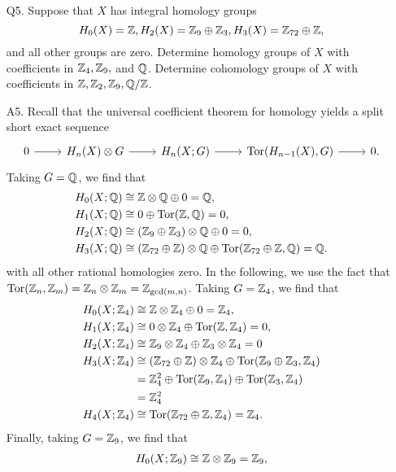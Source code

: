 \documentclass{../mathnotes}
\begin{document}
\begin{enumerate}
        \newpage
    \item[Q5.] Suppose that $X$ has integral homology groups
        \[H_0(X)=\mathbb{Z}, H_2(X)=\mathbb{Z}_9\oplus\mathbb{Z}_3, H_3(X)=\mathbb{Z}_{72}\oplus\mathbb{Z},\]
        and all other groups are zero. Determine homology groups of $X$ with
        coefficients in $\mathbb{Z}_4,\mathbb{Z}_9,$ and $\mathbb{Q}$. Determine cohomology groups
        of $X$ with coefficients in $\mathbb{Z},\mathbb{Z}_2,\mathbb{Z}_9,\mathbb{Q}/\mathbb{Z}$.
    \item[A5.] Recall that the universal coefficient theorem for homology
        yields a split short exact sequence
        \begin{equation*}
            \begin{tikzcd}
                0\ar{r}& H_n(X)\otimes G\ar{r}& H_n(X;G)\ar{r}& \Tor(H_{n-1}(X),G)\ar{r}& 0.
            \end{tikzcd}
        \end{equation*}
        Taking $G=\mathbb{Q}$, we find that 
        \begin{align*}
            H_0(X;\mathbb{Q})&\cong\mathbb{Z}\otimes\mathbb{Q}\oplus 0=\mathbb{Q},\\
            H_1(X;\mathbb{Q})&\cong0\oplus\operatorname{Tor}(\mathbb{Z},\mathbb{Q})=0,\\
            H_2(X;\mathbb{Q})&\cong (\mathbb{Z}_9\oplus\mathbb{Z}_3)\otimes\mathbb{Q}\oplus0=0,\\
            H_3(X;\mathbb{Q})&\cong (\mathbb{Z}_{72}\oplus\mathbb{Z})\otimes\mathbb{Q}\oplus\operatorname{Tor}(\mathbb{Z}_{72}\oplus\mathbb{Z},\mathbb{Q})=\mathbb{Q}.
        \end{align*}
        with all other rational homologies zero.
        In the following, we use the fact that $\operatorname{Tor}(\mathbb{Z}_n,\mathbb{Z}_m)=\mathbb{Z}_n\otimes\mathbb{Z}_m=\mathbb{Z}_{\text{gcd}(m,n)}$.
        Taking $G=\mathbb{Z}_4$, we find that
        \begin{align*}
            H_0(X;\mathbb{Z}_4) &\cong\mathbb{Z}\otimes\mathbb{Z}_4\oplus0=\mathbb{Z}_4,\\
            H_1(X;\mathbb{Z}_4) &\cong0\otimes\mathbb{Z}_4\oplus \operatorname{Tor}(\mathbb{Z},\mathbb{Z}_4)=0,\\
            H_2(X;\mathbb{Z}_4) &\cong\mathbb{Z}_9\otimes\mathbb{Z}_4\oplus\mathbb{Z}_3\otimes\mathbb{Z}_4=0\\
            H_3(X;\mathbb{Z}_4) &\cong(\mathbb{Z}_{72}\oplus\mathbb{Z})\otimes\mathbb{Z}_4\oplus\operatorname{Tor}(\mathbb{Z}_9\oplus\mathbb{Z}_3,\mathbb{Z}_4)\\
                        &= \mathbb{Z}_4^2\oplus\operatorname{Tor}(\mathbb{Z}_9,\mathbb{Z}_4)\oplus\operatorname{Tor}(\mathbb{Z}_3,\mathbb{Z}_4)\\
                        &= \mathbb{Z}_4^2\\
            H_4(X;\mathbb{Z}_4) &\cong\operatorname{Tor}(\mathbb{Z}_{72}\oplus\mathbb{Z},\mathbb{Z}_4)=\mathbb{Z}_4.
        \end{align*}
        Finally, taking $G=\mathbb{Z}_9$, we find that
        \begin{align*}
            H_0(X;\Z_9) &\cong \Z\otimes\Z_9=\Z_9,\\

\end{align*}
\end{enumerate}
\end{document}
